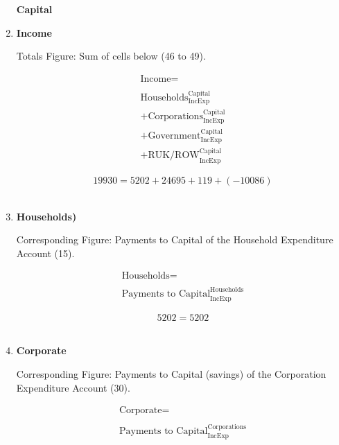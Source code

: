 \begin{enumerate}
\pagebreak


\begin{center}
\textbf{\LARGE Capital}
\end{center}

\item \textbf {Income}

Totals Figure: Sum of cells below (46 to 49).

\begin{equation}
\begin{split}
\text{Income} =  \\ \\
\text{Households}^\text{Capital}_\text{IncExp}\\
+\text{Corporations}^\text{Capital}_\text{IncExp}\\
+\text{Government}^\text{Capital}_\text{IncExp}\\
+\text{RUK/ROW}^\text{Capital}_\text{IncExp}
\end{split} \label{eq:2.5.48}
\end{equation}

\begin{equation} \nonumber
19930 = 5202+24695+119+(-10086)
\end{equation}\\


\item \textbf {Households)}

Corresponding Figure: Payments to Capital of the Household Expenditure Account (15).

\begin{equation}
\begin{split}
\text{Households} =  \\ \\
\text{Payments to Capital}^\text{Households}_\text{IncExp}
\end{split} \label{eq:2.5.49}
\end{equation}

\begin{equation} \nonumber
5202 = 5202
\end{equation}\\


\item \textbf {Corporate}

Corresponding Figure: Payments to Capital (savings) of the Corporation Expenditure Account (30).

\begin{equation}
\begin{split}
\text{Corporate} =  \\ \\
\text{Payments to Capital}^\text{Corporations}_\text{IncExp}
\end{split} \label{eq:2.5.50}
\end{equation}


\end{enumerate}
